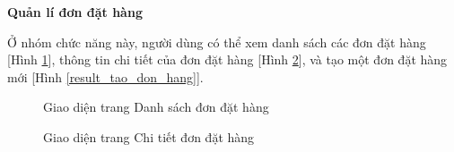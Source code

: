 \textbf{Quản lí đơn đặt hàng}

Ở nhóm chức năng này, người dùng có thể xem danh sách các đơn đặt hàng [Hình \ref{result_danh_sach_don_hang}], thông tin chi tiết của đơn đặt hàng [Hình \ref{result_chi_tiet_don_hang}], và tạo một đơn đặt hàng mới [Hình \ref{result_tao_don_hang}].

\begin{figure}[H]
    \begin{center}
        \caption{Giao diện trang Danh sách đơn đặt hàng}
        \label{result_danh_sach_don_hang}
    \end{center}
\end{figure}

\begin{figure}[H]
    \begin{center}
        \caption{Giao diện trang Chi tiết đơn đặt hàng}
        \label{result_chi_tiet_don_hang}
    \end{center}
\end{figure}

